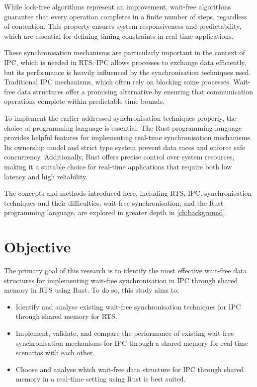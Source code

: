 While lock-free algorithms represent an improvement, wait-free algorithms guarantee that every operation completes in a finite number of steps, regardless of contention. This property ensures system responsiveness and predictability, which are essential for defining timing constraints in real-time applications. \cite{kogan2012methodology, herlihy1991wait, brandenburg2019multiprocessorrealtimelockingprotocols}

These synchronisation mechanisms are particularly important in the context of \ac{IPC}, which is needed in \ac{RTS}. \ac{IPC} allows processes to exchange data efficiently, but its performance is heavily influenced by the synchronisation techniques used. Traditional \ac{IPC} mechanisms, which often rely on blocking some processes. Wait-free data structures offer a promising alternative by ensuring that communication operations complete within predictable time bounds. \cite{timnat2014practical, michael1996simple, huang2002improvingWaitFree, pellegrini2020relevancewaitfreecoordinationalgorithms}

To implement the earlier addressed synchronisation techniques properly, the choice of programming language is essential. The Rust programming language provides helpful features for implementing real-time synchronisation mechanisms. Its ownership model and strict type system prevent data races and enforce safe concurrency. Additionally, Rust offers precise control over system resources, making it a suitable choice for real-time applications that require both low latency and high reliability. \cite{xu2023rust, sharma2024rustembeddedsystemscurrent}

The concepts and methods introduced here, including \ac{RTS}, \ac{IPC}, synchronisation techniques and their difficulties, wait-free synchronisation, and the Rust programming language, are explored in greater depth in \cref{ch:background}. 

\section{Objective}\label{sec:objective}
The primary goal of this research is to identify the most effective wait-free data structures for implementing wait-free synchronisation in \ac{IPC} through shared memory in \ac{RTS} using Rust. To do so, this study aims to:

\begin{itemize}
\item Identify and analyse existing wait-free synchronisation techniques for \ac{IPC} through shared memory for \ac{RTS}.
\item Implement, validate, and compare the performance of existing wait-free synchronisation mechanisms for \ac{IPC} through a shared memory for real-time scenarios with each other.
\item Choose and analyse which wait-free data structure for \ac{IPC} through shared memory in a real-time setting using Rust is best suited.
\end{itemize}

